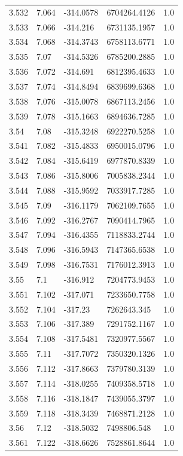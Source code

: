 \begin{tabular}{lllll}
3.532 & 7.064 & -314.0578 & 6704264.4126 & 1.0 \\
3.533 & 7.066 & -314.216 & 6731135.1957 & 1.0 \\
3.534 & 7.068 & -314.3743 & 6758113.6771 & 1.0 \\
3.535 & 7.07 & -314.5326 & 6785200.2885 & 1.0 \\
3.536 & 7.072 & -314.691 & 6812395.4633 & 1.0 \\
3.537 & 7.074 & -314.8494 & 6839699.6368 & 1.0 \\
3.538 & 7.076 & -315.0078 & 6867113.2456 & 1.0 \\
3.539 & 7.078 & -315.1663 & 6894636.7285 & 1.0 \\
3.54 & 7.08 & -315.3248 & 6922270.5258 & 1.0 \\
3.541 & 7.082 & -315.4833 & 6950015.0796 & 1.0 \\
3.542 & 7.084 & -315.6419 & 6977870.8339 & 1.0 \\
3.543 & 7.086 & -315.8006 & 7005838.2344 & 1.0 \\
3.544 & 7.088 & -315.9592 & 7033917.7285 & 1.0 \\
3.545 & 7.09 & -316.1179 & 7062109.7655 & 1.0 \\
3.546 & 7.092 & -316.2767 & 7090414.7965 & 1.0 \\
3.547 & 7.094 & -316.4355 & 7118833.2744 & 1.0 \\
3.548 & 7.096 & -316.5943 & 7147365.6538 & 1.0 \\
3.549 & 7.098 & -316.7531 & 7176012.3913 & 1.0 \\
3.55 & 7.1 & -316.912 & 7204773.9453 & 1.0 \\
3.551 & 7.102 & -317.071 & 7233650.7758 & 1.0 \\
3.552 & 7.104 & -317.23 & 7262643.345 & 1.0 \\
3.553 & 7.106 & -317.389 & 7291752.1167 & 1.0 \\
3.554 & 7.108 & -317.5481 & 7320977.5567 & 1.0 \\
3.555 & 7.11 & -317.7072 & 7350320.1326 & 1.0 \\
3.556 & 7.112 & -317.8663 & 7379780.3139 & 1.0 \\
3.557 & 7.114 & -318.0255 & 7409358.5718 & 1.0 \\
3.558 & 7.116 & -318.1847 & 7439055.3797 & 1.0 \\
3.559 & 7.118 & -318.3439 & 7468871.2128 & 1.0 \\
3.56 & 7.12 & -318.5032 & 7498806.548 & 1.0 \\
3.561 & 7.122 & -318.6626 & 7528861.8644 & 1.0 \\

\end{tabular}
